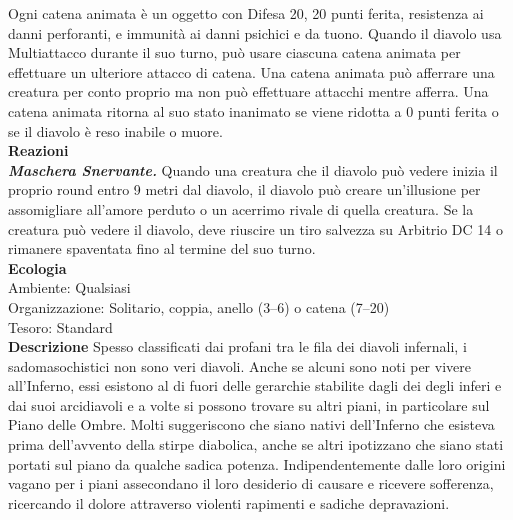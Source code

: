 \begin{multicols}{2}
Ogni catena animata è un oggetto con Difesa 20, 20 punti ferita, resistenza ai danni perforanti, e immunità ai danni psichici e da tuono. Quando il diavolo usa Multiattacco durante il suo turno, può usare ciascuna catena animata per effettuare un ulteriore attacco di catena. Una catena animata può afferrare una creatura per conto proprio ma non può effettuare attacchi mentre afferra. Una catena animata ritorna al suo stato inanimato se viene ridotta a 0 punti ferita o se il diavolo è reso inabile o muore.\\
\textbf{Reazioni}\\
\emph{\textbf{Maschera Snervante.}} Quando una creatura che il diavolo può vedere inizia il proprio round entro 9 metri dal diavolo, il diavolo può creare un'illusione per assomigliare all'amore perduto o un acerrimo rivale di quella creatura. Se la creatura può vedere il diavolo, deve riuscire un tiro salvezza su Arbitrio DC 14 o rimanere spaventata fino al termine del suo turno.\\
\textbf{Ecologia}\\
Ambiente: Qualsiasi\\
Organizzazione: Solitario, coppia, anello (3–6) o catena (7–20)\\
Tesoro: Standard\\
\textbf{Descrizione}
Spesso classificati dai profani tra le fila dei diavoli infernali, i sadomasochistici non sono veri diavoli. Anche se alcuni sono noti per vivere all'Inferno, essi esistono al di fuori delle gerarchie stabilite dagli dei degli inferi e dai suoi arcidiavoli e a volte si possono trovare su altri piani, in particolare sul Piano delle Ombre. Molti suggeriscono che siano nativi dell'Inferno che esisteva prima dell’avvento della stirpe diabolica, anche se altri ipotizzano che siano stati portati sul piano da qualche sadica potenza. Indipendentemente dalle loro origini vagano per i piani assecondano il loro desiderio di causare e ricevere sofferenza, ricercando il dolore attraverso violenti rapimenti e sadiche depravazioni.\\


\end{multicols}
